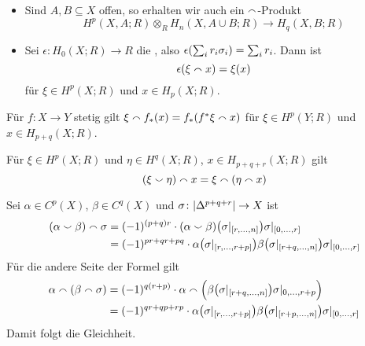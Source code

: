 \begin{bemerkung}[label=bem_augmentation_cap] \leavevmode
	\begin{itemize}
		\item Sind $A,B \subseteq X$ offen, so erhalten wir auch ein $\capp$-Produkt
		\[
			H^p(X,A;R) \otimes_R H_n(X,A\cup B;R) \longrightarrow H_q(X,B;R)
		\]
		\item Sei $\epsilon \colon H_0(X;R) \to R$ die , also $\epsilon \enbrace*{\sum_{i}r_i \sigma_i} = \sum_i r_i$. Dann ist 
		\[
			\epsilon \enbrace*{\xi \capp x} = \xi(x)
		\]
		für $\xi \in H^p(X;R)$ und $x \in H_p(X;R)$.
	\end{itemize}
\end{bemerkung}

\begin{lemma}
	Für $f \colon X \to Y$ stetig gilt $\xi \capp f_*(x) = f_* \enbrace*{f^* \xi \capp x}$ für $\xi \in H^p(Y;R)$ und $x \in H_{p+q}(X;R)$.
\end{lemma}

\begin{lemma}
	Für $\xi \in H^p(X;R)$ und $\eta \in H^q(X;R)$, $x \in H_{p+q+r}(X;R)$ gilt 
	\[
		\enbrace*{\xi \cupp \eta} \capp x = \xi \capp \enbrace*{\eta \capp x}
	\]
\end{lemma}
\begin{beweis}
	Sei $\alpha \in C^p(X)$, $\beta \in C^q(X)$ und $\sigma \colon \abs{\Delta^{p+q+r}}\to X$ ist
	\begin{align}
		\enbrace*{\alpha \cupp \beta} \capp \sigma &= (-1)^{(p+q)r} \cdot (\alpha \cupp \beta)\enbrace*{\sigma|_{\benbrace*{r,\ldots ,n}}}   \sigma|_{\benbrace*{0,\ldots ,r}} \\
		&= (-1)^{pr+qr+pq} \cdot \alpha \enbrace*{\sigma|_{\benbrace*{r,\ldots ,r+p}}} \beta \enbrace*{\sigma|_{\benbrace*{r+q,\ldots ,n}}} \sigma|_{\benbrace*{0,\ldots ,r}}
	\end{align}
	Für die andere Seite der Formel gilt
	\begin{align}
		\alpha \capp (\beta \capp \sigma) &= (-1)^{q(r+p)} \cdot \alpha \capp \enbrace[\Big]{\beta \enbrace*{\sigma|_{\benbrace*{r+q,\ldots ,n}}} \sigma|_{0,\ldots ,r+p}} \\
		&= (-1)^{qr+qp+rp} \cdot \alpha \enbrace*{\sigma|_{\benbrace*{r,\ldots,r+p}}} \beta \enbrace*{\sigma|_{\benbrace*{r+p,\ldots ,n}}} \sigma|_{\benbrace*{0,\ldots ,r}}
	\end{align}
	Damit folgt die Gleichheit.
\end{beweis}

